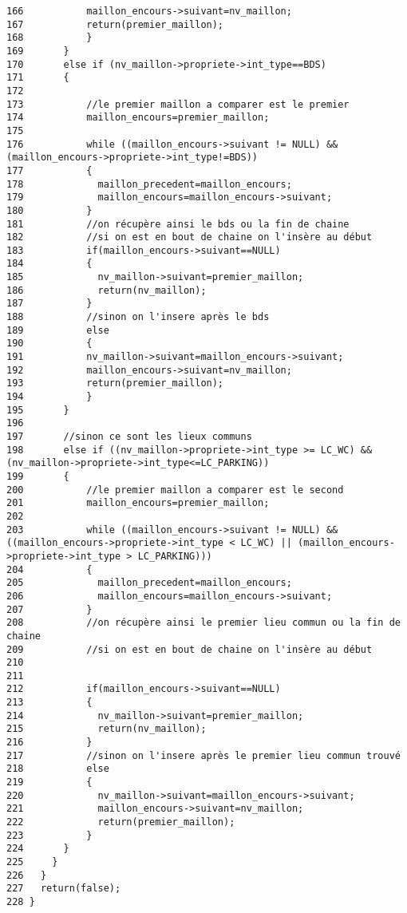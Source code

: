 \begin{Code}
\begin{verbatim}
166           maillon_encours->suivant=nv_maillon;
167           return(premier_maillon);
168           }
169       }
170       else if (nv_maillon->propriete->int_type==BDS)
171       {   
172       
173           //le premier maillon a comparer est le premier
174           maillon_encours=premier_maillon;
175         
176           while ((maillon_encours->suivant != NULL) &&  (maillon_encours->propriete->int_type!=BDS))
177           {
178             maillon_precedent=maillon_encours;
179             maillon_encours=maillon_encours->suivant;
180           }
181           //on récupère ainsi le bds ou la fin de chaine
182           //si on est en bout de chaine on l'insère au début
183           if(maillon_encours->suivant==NULL)
184           {
185             nv_maillon->suivant=premier_maillon;
186             return(nv_maillon);
187           }
188           //sinon on l'insere après le bds
189           else
190           {
191           nv_maillon->suivant=maillon_encours->suivant;
192           maillon_encours->suivant=nv_maillon;
193           return(premier_maillon);
194           }
195       }
196             
197       //sinon ce sont les lieux communs
198       else if ((nv_maillon->propriete->int_type >= LC_WC) && (nv_maillon->propriete->int_type<=LC_PARKING))
199       {       
200           //le premier maillon a comparer est le second
201           maillon_encours=premier_maillon;
202 
203           while ((maillon_encours->suivant != NULL) &&  ((maillon_encours->propriete->int_type < LC_WC) || (maillon_encours->propriete->int_type > LC_PARKING)))
204           {
205             maillon_precedent=maillon_encours;
206             maillon_encours=maillon_encours->suivant;
207           }
208           //on récupère ainsi le premier lieu commun ou la fin de chaine
209           //si on est en bout de chaine on l'insère au début
210           
211 
212           if(maillon_encours->suivant==NULL)
213           {
214             nv_maillon->suivant=premier_maillon;
215             return(nv_maillon);
216           }
217           //sinon on l'insere après le premier lieu commun trouvé
218           else
219           {
220             nv_maillon->suivant=maillon_encours->suivant;
221             maillon_encours->suivant=nv_maillon;
222             return(premier_maillon);
223           }
224       }       
225     }
226   }
227   return(false);
228 }
\end{verbatim}\end{Code}


